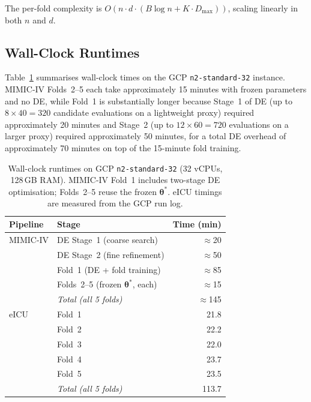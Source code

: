 \documentclass[journal]{IEEEtran}
\begin{document}
	The per-fold complexity is $O\!\left(n \cdot d \cdot (B \log n + K \cdot D_{\max})\right)$, scaling linearly in both $n$ and $d$.
	
	\subsection{Wall-Clock Runtimes}
	
	Table~\ref{tab:runtimes_supp} summarises wall-clock times on the GCP \texttt{n2-standard-32} instance. MIMIC-IV Folds~2--5 each take approximately 15 minutes with frozen parameters and no DE, while Fold~1 is substantially longer because Stage~1 of DE (up to $8\times40=320$ candidate evaluations on a lightweight proxy) required approximately 20 minutes and Stage~2 (up to $12\times60=720$ evaluations on a larger proxy) required approximately 50 minutes, for a total DE overhead of approximately 70 minutes on top of the 15-minute fold training.
	
	\begin{table}[h]
		\centering
		\caption{Wall-clock runtimes on GCP \texttt{n2-standard-32} (32 vCPUs, 128\,GB RAM). MIMIC-IV Fold~1 includes two-stage DE optimisation; Folds~2--5 reuse the frozen $\boldsymbol{\theta}^*$. eICU timings are measured from the GCP run log.}
		\label{tab:runtimes_supp}
		\begin{tabular}{llr}
			\toprule
			\textbf{Pipeline} & \textbf{Stage} & \textbf{Time (min)} \\
			\midrule
			MIMIC-IV & DE Stage~1 (coarse search) & $\approx$20 \\
			& DE Stage~2 (fine refinement) & $\approx$50 \\
			& Fold~1 (DE + fold training) & $\approx$85 \\
			& Folds~2--5 (frozen $\boldsymbol{\theta}^*$, each) & $\approx$15 \\
			& \textit{Total (all 5 folds)} & $\approx$145 \\
			\midrule
			eICU & Fold~1 & 21.8 \\
			& Fold~2 & 22.2 \\
			& Fold~3 & 22.0 \\
			& Fold~4 & 23.7 \\
			& Fold~5 & 23.5 \\
			& \textit{Total (all 5 folds)} & 113.7 \\
			\bottomrule
		\end{tabular}
	\end{table}
	
\end{document}
